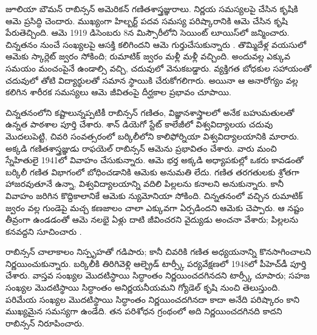 \documentclass[../../../include/open-logic-section]{subfiles}
\begin{document}



జూలియా బౌమన్ రాబిన్సన్ అమెరికన్ గణితశాస్త్రజ్ఞురాలు. నిర్ణయ సమస్యలపై చేసిన కృషికి ఆమె ప్రసిద్ధి చెందారు. ముఖ్యంగా హిల్బర్ట్ పదవ సమస్య పరిష్కారానికి ఆమె చేసిన కృషి పేరుతెచ్చింది. ఆమె 1919 డిసెంబరు 8న మిస్సౌరీలోని సెయింట్ లూయిస్‌లో జన్మించారు. చిన్నతనం నుంచే సంఖ్యలపై ఆసక్తి కలిగిందని ఆమె గుర్తుచేసుకున్నారు \citep[4]{Reid1986}. తొమ్మిదేళ్ల వయసులో ఆమెకు స్కార్లెట్ జ్వరం సోకింది; రుమాటిక్ జ్వరం మళ్లీ మళ్లీ వచ్చింది. అందువల్ల ఎక్కువ సమయం మంచంపైనే ఉండాల్సి వచ్చి, చదువులో వెనుకబడ్డారు. వ్యక్తిగత బోధకుల సహాయంతో చదువులో తోటి విద్యార్థులతో సమాన స్థాయికి చేరుకోగలిగారు. అయినా ఆ అనారోగ్యం వల్ల కలిగిన శారీరక సమస్యలు ఆమె జీవితంపై దీర్ఘకాల ప్రభావం చూపాయి.

చిన్నతనంలోని కష్టాలున్నప్పటికీ రాబిన్సన్ గణితం, విజ్ఞానశాస్త్రాలలో అనేక బహుమతులతో ఉన్నత పాఠశాల పూర్తి చేశారు. శాన్ డియెగో స్టేట్ కాలేజీలో విశ్వవిద్యాలయ చదువు మొదలుపెట్టి, చివరి సంవత్సరంలో బర్కిలీలోని కాలిఫోర్నియా విశ్వవిద్యాలయానికి మారారు. అక్కడి గణితశాస్త్రజ్ఞుడు రాఫయెల్ రాబిన్సన్ ఆమెను ప్రభావితం చేశారు. వారు మంచి స్నేహితులై 1941లో వివాహం చేసుకున్నారు. ఆమె భర్త అక్కడి అధ్యాపకుల్లో ఒకరు కావడంతో బర్కిలీ గణిత విభాగంలో బోధించడానికి ఆమెకు అనుమతి లేదు. గణిత తరగతులకు శ్రోతగా హాజరవుతూనే ఉన్నా, విశ్వవిద్యాలయాన్ని వదిలి పిల్లలను కనాలని అనుకున్నారు. కానీ వివాహం జరిగిన కొద్దికాలానికే ఆమెకు న్యుమోనియా సోకింది. చిన్నతనంలో వచ్చిన రుమాటిక్ జ్వరం వల్ల గుండెపై మచ్చ కణజాలం చాలా ఎక్కువగా ఏర్పడిందని ఆమెకు చెప్పారు. ఆ నష్టం తీవ్రంగా ఉండడంతో ఆమె నలభై ఏళ్లు దాటి జీవించరని వైద్యుడు అంచనా వేశారు; పిల్లలను కనవద్దని సూచించారు \citep[13]{Reid1986}.

రాబిన్సన్ చాలాకాలం నిస్పృహతో గడిపారు; కానీ చివరికి గణిత అధ్యయనాన్ని కొనసాగించాలని నిర్ణయించుకున్నారు. బర్కిలీకి తిరిగివెళ్లి ఆల్ఫ్రెడ్ టార్స్కీ పర్యవేక్షణలో 1948లో పీహెచ్‌డీ పూర్తి చేశారు. వాస్తవ సంఖ్యల మొదటిస్థాయి సిద్ధాంతం నిర్ణయించదగినదని టార్స్కీ చూపారు; సహజ సంఖ్యల మొదటిస్థాయి సిద్ధాంతం అనిర్ణయనీయమని గ్యోడెల్ కృషి నుంచి తెలుస్తుంది. పరిమేయ సంఖ్యల మొదటిస్థాయి సిద్ధాంతం నిర్ణయించదగినదా కాదా అనేది పరిష్కారం కాని ముఖ్యమైన సమస్యగా ఉండేది. తన పరిశోధన గ్రంథంలో \citeyearpar{Robinson1949} అది నిర్ణయించదగినది కాదని రాబిన్సన్ నిరూపించారు.
\end{document}
